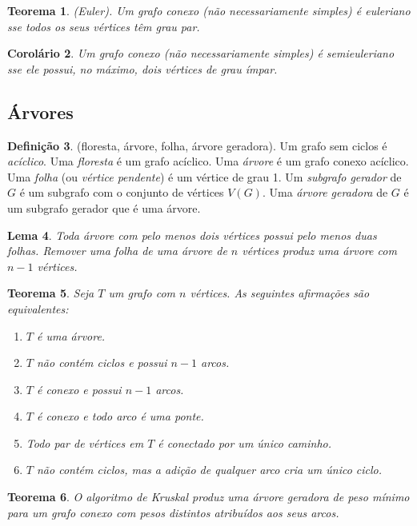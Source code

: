 \documentclass{article}
\theoremstyle{plain}
\newtheorem{thm}{Teorema}[section]
\newtheorem{lem}[thm]{Lema}
\newtheorem{cor}[thm]{Corolário}
\theoremstyle{definition}
\newtheorem{defn}[thm]{Definição}
\theoremstyle{remark}
\begin{document}
\begin{thm} (Euler).
    Um grafo conexo (não necessariamente simples) é euleriano sse todos os seus vértices têm grau par.
\end{thm}

\begin{cor}
    Um grafo conexo (não necessariamente simples) é semieuleriano sse ele possui, no máximo, dois vértices de grau ímpar.
\end{cor}

\subsection{Árvores}

\begin{defn} (floresta, árvore, folha, árvore geradora).
    Um grafo sem ciclos é \emph{acíclico}. Uma \emph{floresta} é um grafo acíclico. Uma \emph{árvore} é um grafo conexo acíclico. Uma \emph{folha} (ou \emph{vértice pendente}) é um vértice de grau 1. Um \emph{subgrafo gerador} de \(G\) é um subgrafo com o conjunto de vértices \(V(G)\). Uma \emph{árvore geradora} de \(G\) é um subgrafo gerador que é uma árvore.
\end{defn}

\begin{lem}
    Toda árvore com pelo menos dois vértices possui pelo menos duas folhas. Remover uma folha de uma árvore de \(n\) vértices produz uma árvore com \(n-1\) vértices.
\end{lem}

\begin{thm}
    Seja \(T\) um grafo com \(n\) vértices. As seguintes afirmações são equivalentes:
    \begin{enumerate}
        \item \(T\) é uma árvore.
        \item \(T\) não contém ciclos e possui \(n-1\) arcos.
        \item \(T\) é conexo e possui \(n-1\) arcos.
        \item \(T\) é conexo e todo arco é uma ponte.
        \item Todo par de vértices em \(T\) é conectado por um único caminho.
        \item \(T\) não contém ciclos, mas a adição de qualquer arco cria um único ciclo.
    \end{enumerate}
\end{thm}

\begin{thm}
    O algoritmo de Kruskal produz uma árvore geradora de peso mínimo para um grafo conexo com pesos distintos atribuídos aos seus arcos.
\end{thm}
\end{document}
